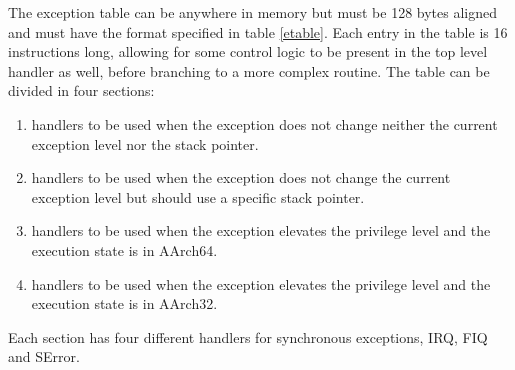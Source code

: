 \documentclass[12pt,a4paper,openright,twoside]{report}
\begin{document}
The exception table can be anywhere in memory but must be 128 bytes aligned and 
must have the format specified in table \ref{etable}.
Each entry in the table is 16 instructions long, allowing for some control logic 
to be present in the top level handler as well, before branching to a more complex
routine.
The table can be divided in four sections:
\begin{enumerate}
    \item handlers to be used when the exception does not change neither the current 
        exception level nor the stack pointer.
    \item handlers to be used when the exception does not change the current 
        exception level but should use a specific stack pointer.
    \item handlers to be used when the exception elevates the privilege level and
        the execution state is in AArch64.
    \item handlers to be used when the exception elevates the privilege level and
        the execution state is in AArch32.
\end{enumerate}

Each section has four different handlers for synchronous exceptions, IRQ, FIQ
and SError.
\end{document}

